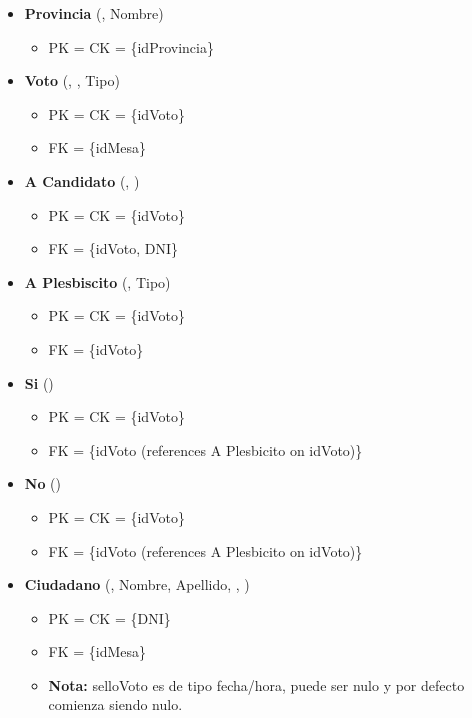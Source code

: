 \begin{itemize}
	\item \textbf{Provincia} (, Nombre) 
	\begin{itemize}
		\item PK = CK = \{idProvincia\}
	\end{itemize}
	\vspace{1mm}

	\item \textbf{Voto} (, , Tipo) 
	\begin{itemize}
		\item PK = CK = \{idVoto\}
		\item FK = \{idMesa\}
	\end{itemize}
	\vspace{1mm}

	\item \textbf{A Candidato} (, ) 
	\begin{itemize}
		\item PK = CK = \{idVoto\}
		\item FK = \{idVoto, DNI\}
	\end{itemize}
	\vspace{1mm}

	\item \textbf{A Plesbiscito} (, Tipo) 
	\begin{itemize}
		\item PK = CK = \{idVoto\}
		\item FK = \{idVoto\}
	\end{itemize}
	\vspace{1mm}

	\item \textbf{Si} () 
	\begin{itemize}
		\item PK = CK = \{idVoto\}
		\item FK = \{idVoto (references A Plesbicito on idVoto)\}
	\end{itemize}
	\vspace{1mm}

	\item \textbf{No} () 
	\begin{itemize}
		\item PK = CK = \{idVoto\}
		\item FK = \{idVoto (references A Plesbicito on idVoto)\}
	\end{itemize}
	\vspace{1mm}


	\item \textbf{Ciudadano} (, Nombre, Apellido, , ) 
	\begin{itemize}
		\item PK = CK = \{DNI\}
		\item FK = \{idMesa\}
		\item \textbf{Nota:} selloVoto es de tipo fecha/hora, puede ser nulo y por defecto comienza siendo nulo.
	\end{itemize}
	\vspace{1mm}



\end{itemize}
